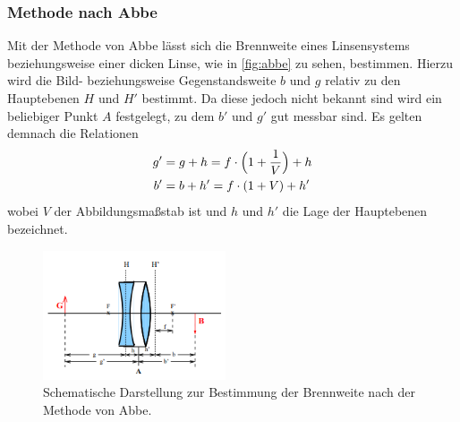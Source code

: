     \subsubsection{Methode nach Abbe}    
        Mit der Methode von Abbe lässt sich die Brennweite eines Linsensystems beziehungsweise einer dicken Linse,
        wie in \autoref{fig:abbe} zu sehen, bestimmen. Hierzu wird die Bild- beziehungsweise Gegenstandsweite $b$ und $g$ relativ zu
        den Hauptebenen $H$ und $H'$ bestimmt. Da diese jedoch nicht bekannt sind wird ein beliebiger Punkt $A$ festgelegt, zu dem
        $b'$ und $g'$ gut messbar sind. Es gelten demnach die Relationen
        \begin{align}
        \label{eqn:abbe}
        g' &= g + h = f \cdot \Bigl(1 + \frac{1}{V}  \Bigr )+ h \\
        b' &= b + h' = f \cdot (1 + V) + h'
        \end{align}
        wobei $V$ der Abbildungsmaßstab ist und $h$ und $h'$ die Lage der Hauptebenen bezeichnet.
        \begin{figure}
            \centering
            \includegraphics[width=0.48\textwidth]{content/abbe.png}
            \caption{Schematische Darstellung zur Bestimmung der Brennweite nach der Methode von Abbe.}
            \label{fig:abbe}
        \end{figure}
